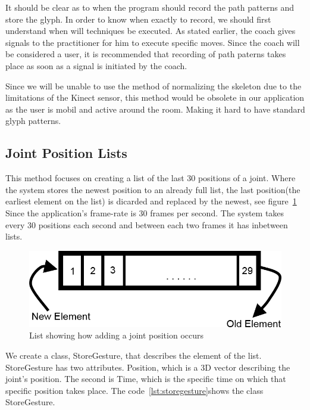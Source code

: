 It should be clear as to when the program should record the path patterns and store the glyph. In order to know when exactly to record, we should first understand when will techniques be executed. As stated earlier, the coach gives signals to the practitioner for him to execute specific moves. Since the coach will be considered a user, it is recommended that recording of path paterns takes place as soon as a signal is initiated by the coach.

Since we will be unable to use the method of normalizing the skeleton due to the limitations of the Kinect sensor, this method would be obsolete in our application as the user is mobil and active around the room. Making it hard to have standard glyph patterns.

\subsection{Joint Position Lists}
This method focuses on creating a list of the last 30 positions of a joint. Where the system stores the newest position to an already full list, the last position(the earliest element on the list) is dicarded and replaced by the newest, see figure~\ref{stack}
Since the application's frame-rate is 30 frames per second. The system takes every 30 positions each second and between each two frames it has inbetween lists.

\begin{figure}[!htbp]
\centering
\includegraphics[width=1\textwidth]{images/stack.png}
\caption{List showing how adding a joint position occurs}
\label{stack}
\end{figure}

We create a class, StoreGesture, that describes the element of the list. StoreGesture has two attributes. Position, which is a 3D vector describing the joint's position. The second is Time, which is the specific time on which that specific position takes place. The code~\ref{lst:storegesture}shows the class StoreGesture.



